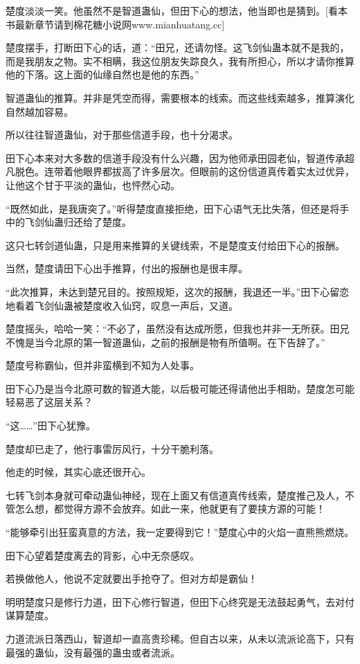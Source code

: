 \begin{this_body}
楚度淡淡一笑。他虽然不是智道蛊仙，但田下心的想法，他当即也是猜到。[看本书最新章节请到棉花糖小说网www.mianhuatang.cc]

楚度摆手，打断田下心的话，道：“田兄，还请勿怪。这飞剑仙蛊本就不是我的，而是我朋友之物。实不相瞒，我这位朋友失踪良久，我有所担心，所以才请你推算他的下落。这上面的仙缘自然也是他的东西。”

智道蛊仙的推算。并非是凭空而得，需要根本的线索。而这些线索越多，推算演化自然越加容易。

所以往往智道蛊仙，对于那些信道手段，也十分渴求。

田下心本来对大多数的信道手段没有什么兴趣，因为他师承田园老仙，智道传承超凡脱色。连带着他眼界都拔高了许多层次。但眼前的这份信道真传着实太过优异，让他这个甘于平淡的蛊仙，也怦然心动。

“既然如此，是我唐突了。”听得楚度直接拒绝，田下心语气无比失落，但还是将手中的飞剑仙蛊归还给了楚度。

这只七转剑道仙蛊，只是用来推算的关键线索，不是楚度支付给田下心的报酬。

当然，楚度请田下心出手推算，付出的报酬也是很丰厚。

“此次推算，未达到楚兄目的。按照规矩，这次的报酬，我退还一半。”田下心留恋地看着飞剑仙蛊被楚度收入仙窍，叹息一声后，又道。

楚度摇头，哈哈一笑：“不必了，虽然没有达成所愿，但我也并非一无所获。田兄不愧是当今北原的第一智道蛊仙，之前的报酬是物有所值啊。在下告辞了。”

楚度号称霸仙，但并非蛮横到不知为人处事。

田下心乃是当今北原可数的智道大能，以后极可能还得请他出手相助，楚度怎可能轻易恶了这层关系？

“这……”田下心犹豫。

楚度却已走了，他行事雷厉风行，十分干脆利落。

他走的时候，其实心底还很开心。

七转飞剑本身就可牵动蛊仙神经，现在上面又有信道真传线索，楚度推己及人，不管怎么想，都觉得方源不会放弃。如此一来，他就更有了要挟方源的可能！

“能够牵引出狂蛮真意的方法，我一定要得到它！”楚度心中的火焰一直熊熊燃烧。

田下心望着楚度离去的背影，心中无奈感叹。

若换做他人，他说不定就要出手抢夺了。但对方却是霸仙！

明明楚度只是修行力道，田下心修行智道，但田下心终究是无法鼓起勇气，去对付谋算楚度。

力道流派日落西山，智道却一直高贵珍稀。但自古以来，从未以流派论高下，只有最强的蛊仙，没有最强的蛊虫或者流派。


\end{this_body}
